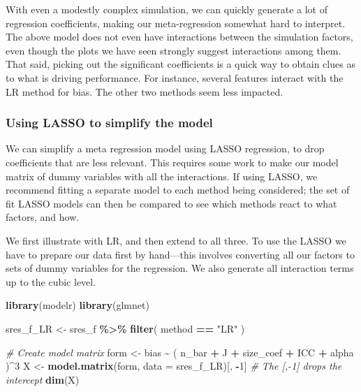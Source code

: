 \documentclass[
]{book}
\newenvironment{Shaded}{\begin{snugshade}}{\end{snugshade}}
\newcommand{\AttributeTok}[1]{\textcolor[rgb]{0.13,0.29,0.53}{#1}}
\newcommand{\CommentTok}[1]{\textcolor[rgb]{0.56,0.35,0.01}{\textit{#1}}}
\newcommand{\DecValTok}[1]{\textcolor[rgb]{0.00,0.00,0.81}{#1}}
\newcommand{\FunctionTok}[1]{\textcolor[rgb]{0.13,0.29,0.53}{\textbf{#1}}}
\newcommand{\NormalTok}[1]{#1}
\newcommand{\OtherTok}[1]{\textcolor[rgb]{0.56,0.35,0.01}{#1}}
\newcommand{\SpecialCharTok}[1]{\textcolor[rgb]{0.81,0.36,0.00}{\textbf{#1}}}
\newcommand{\StringTok}[1]{\textcolor[rgb]{0.31,0.60,0.02}{#1}}
\begin{document}
With even a modestly complex simulation, we can quickly generate a lot of regression coefficients, making our meta-regression somewhat hard to interpret.
The above model does not even have interactions between the simulation factors, even though the plots we have seen strongly suggest interactions among them.
That said, picking out the significant coefficients is a quick way to obtain clues as to what is driving performance.
For instance, several features interact with the LR method for bias.
The other two methods seem less impacted.

\subsubsection{Using LASSO to simplify the model}\label{using-lasso-to-simplify-the-model}

We can simplify a meta regression model using LASSO regression, to drop coefficients that are less relevant.
This requires some work to make our model matrix of dummy variables with all the interactions.
If using LASSO, we recommend fitting a separate model to each method being considered;
the set of fit LASSO models can then be compared to see which methods react to what factors, and how.

We first illustrate with LR, and then extend to all three.
To use the LASSO we have to prepare our data first by hand---this involves converting all our factors to sets of dummy variables for the regression.
We also generate all interaction terms up to the cubic level.

\begin{Shaded}
\begin{Highlighting}[]
\FunctionTok{library}\NormalTok{(modelr)}
\FunctionTok{library}\NormalTok{(glmnet)}

\NormalTok{sres\_f\_LR }\OtherTok{\textless{}{-}}\NormalTok{ sres\_f }\SpecialCharTok{\%\textgreater{}\%}
  \FunctionTok{filter}\NormalTok{( method }\SpecialCharTok{==} \StringTok{"LR"}\NormalTok{ )}

\CommentTok{\# Create model matrix}
\NormalTok{form }\OtherTok{\textless{}{-}}\NormalTok{ bias }\SpecialCharTok{\textasciitilde{}}\NormalTok{ ( n\_bar }\SpecialCharTok{+}\NormalTok{ J }\SpecialCharTok{+}\NormalTok{ size\_coef }\SpecialCharTok{+}\NormalTok{ ICC }\SpecialCharTok{+}\NormalTok{ alpha )}\SpecialCharTok{\^{}}\DecValTok{3}
\NormalTok{X }\OtherTok{\textless{}{-}} \FunctionTok{model.matrix}\NormalTok{(form, }\AttributeTok{data =}\NormalTok{ sres\_f\_LR)[, }\SpecialCharTok{{-}}\DecValTok{1}\NormalTok{]}
\CommentTok{\#          The [,{-}1] drops the intercept}
\FunctionTok{dim}\NormalTok{(X)}
\end{Highlighting}
\end{Shaded}
\end{document}
